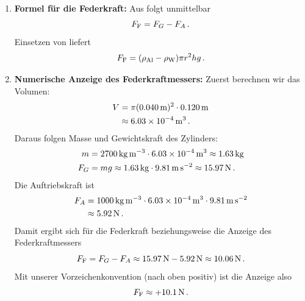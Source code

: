 \documentclass[ngerman]{scrreprt}
\newenvironment{loesungbox}[1]
  {\needspace{5\baselineskip}\begin{loesungboxstyle}[frametitle={#1}]}
  {\end{loesungboxstyle}}
\begin{document}
\begin{loesungbox}{Lösung zu \Cref{aufg:zylinder_unter_wasser}}
\begin{enumerate}
    \item \textbf{Formel für die Federkraft:}
    Aus  folgt unmittelbar
    \begin{equation}\label{eq: zylinder_unter_wasser_federkraft}
        F_{\text{F}} = F_G - F_A \,.
    \end{equation}
    Einsetzen von  liefert
    \begin{equation}
        F_{\text{F}} = (\rho_{\text{Al}} - \rho_{\text{W}}) \pi r^2 h g \,.
    \end{equation}

    \item \textbf{Numerische Anzeige des Federkraftmessers:}
    Zuerst berechnen wir das Volumen:
    \begin{align}
        V &= \pi (\SI{0.040}{\metre})^2 \cdot \SI{0.120}{\metre} \\
        &\approx \SI{6.03e-4}{\metre\cubed} \,.
    \end{align}
    Daraus folgen Masse und Gewichtskraft des Zylinders:
    \begin{align}
        m &= \SI{2700}{\kilogram\per\metre\cubed} \cdot \SI{6.03e-4}{\metre\cubed} \approx \SI{1.63}{\kilogram} \\
        F_G &= m g \approx \SI{1.63}{\kilogram} \cdot \SI{9.81}{\metre\per\second\squared} \approx \SI{15.97}{\newton} \,.
    \end{align}
    Die Auftriebskraft ist
    \begin{align}
        F_A &= \SI{1000}{\kilogram\per\metre\cubed} \cdot \SI{6.03e-4}{\metre\cubed} \cdot \SI{9.81}{\metre\per\second\squared} \\
        &\approx \SI{5.92}{\newton} \,.
    \end{align}
    Damit ergibt sich für die Federkraft beziehungsweise die Anzeige des Federkraftmessers
    \begin{equation}
        F_{\text{F}} = F_G - F_A \approx \SI{15.97}{\newton} - \SI{5.92}{\newton} \approx \SI{10.06}{\newton} \,.
    \end{equation}
    Mit unserer Vorzeichenkonvention (nach oben positiv) ist die Anzeige also
    \begin{equation}
        F_{\text{F}} \approx +\SI{10.1}{\newton} \,.
    \end{equation}
\end{enumerate}
\end{loesungbox}
\end{document}
